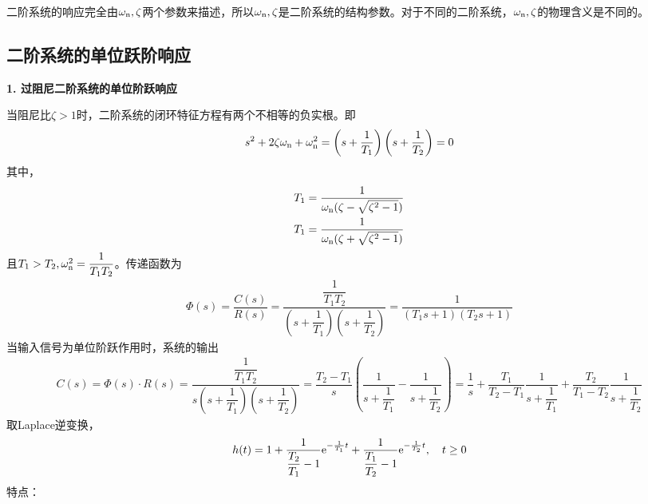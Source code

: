 二阶系统的响应完全由$\omega_{\rm{n}}, \zeta$两个参数来描述，所以$\omega_{\rm{n}} , \zeta $是二阶系统的结构参数。对于不同的二阶系统，$\omega_{\rm{n}} , \zeta $的物理含义是不同的。

\vspace*{0.5em}
\subsection{二阶系统的单位跃阶响应}
\noindent \textbf{1. 过阻尼二阶系统的单位阶跃响应}
\par 当阻尼比$\zeta > 1$时，二阶系统的闭环特征方程有两个不相等的负实根。即
\begin{align}
	s^2 + 2 \zeta \omega_{\rm{n}} +\omega_{\rm{n}}^2=\left(s + \dfrac{1}{T_1}\right)\left(s + \dfrac{1}{T_2}\right)=0
\end{align}
其中，
\begin{align*}
	T_1= \dfrac{1}{\omega_{\rm{n}}(\zeta - \sqrt{\zeta^2 - 1})}\\
	T_1= \dfrac{1}{\omega_{\rm{n}}(\zeta + \sqrt{\zeta^2 - 1})}
\end{align*}
且$T_1 > T_2, \omega_{\rm{n}}^2 = \dfrac{1}{T_1T_2}$。传递函数为
\begin{align}
	\varPhi(s) = \dfrac{C(s)}{R(s)} = \dfrac{\dfrac{1}{T_1T_2}}{\left(s + \dfrac{1}{T_1}\right)\left(s + \dfrac{1}{T_2}\right)}=\dfrac{1}{(T_1s +1)(T_2s+1)}
\end{align}
当输入信号为单位阶跃作用时，系统的输出
\begin{align*}
	C(s) = \varPhi(s)\cdot R(s) = \dfrac{\dfrac{1}{T_1T_2}}{s \left(s + \dfrac{1}{T_1}\right)\left(s + \dfrac{1}{T_2}\right)} = \dfrac{T_2 - T_1}{s} \left(\dfrac{1}{s + \dfrac{1}{T_1}} - \dfrac{1}{s + \dfrac{1}{T_2}}\right) = \dfrac{1}{s} + \dfrac{T_1}{T_2 - T_1}\dfrac{1}{s + \dfrac{1}{T_1}} + \dfrac{T_2}{T_1 - T_2}\dfrac{1}{s + \dfrac{1}{T_2}}
\end{align*}
取Laplace逆变换，
\begin{align}
	h(t) = 1 + \dfrac{1}{\dfrac{T_2}{T_1} - 1}{\rm{e}} ^{- \frac{1}{T_1}t} + \dfrac{1}{\dfrac{T_1}{T_2} - 1}{\rm{e}}^{- \frac{1}{T_2} t}, \quad t \ge 0
\end{align}
\noindent 特点：
